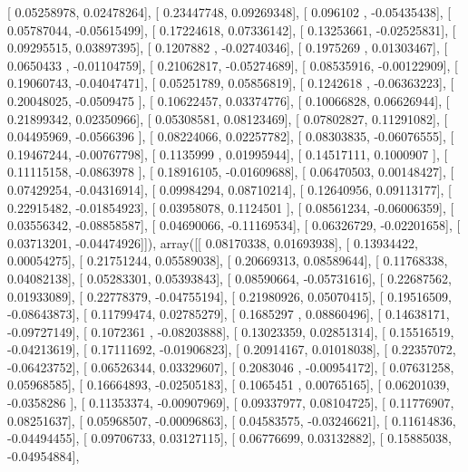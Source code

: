 \documentclass{article}
\begin{document}
       [ 0.05258978,  0.02478264],
       [ 0.23447748,  0.09269348],
       [ 0.096102  , -0.05435438],
       [ 0.05787044, -0.05615499],
       [ 0.17224618,  0.07336142],
       [ 0.13253661, -0.02525831],
       [ 0.09295515,  0.03897395],
       [ 0.1207882 , -0.02740346],
       [ 0.1975269 ,  0.01303467],
       [ 0.0650433 , -0.01104759],
       [ 0.21062817, -0.05274689],
       [ 0.08535916, -0.00122909],
       [ 0.19060743, -0.04047471],
       [ 0.05251789,  0.05856819],
       [ 0.1242618 , -0.06363223],
       [ 0.20048025, -0.0509475 ],
       [ 0.10622457,  0.03374776],
       [ 0.10066828,  0.06626944],
       [ 0.21899342,  0.02350966],
       [ 0.05308581,  0.08123469],
       [ 0.07802827,  0.11291082],
       [ 0.04495969, -0.0566396 ],
       [ 0.08224066,  0.02257782],
       [ 0.08303835, -0.06076555],
       [ 0.19467244, -0.00767798],
       [ 0.1135999 ,  0.01995944],
       [ 0.14517111,  0.1000907 ],
       [ 0.11115158, -0.0863978 ],
       [ 0.18916105, -0.01609688],
       [ 0.06470503,  0.00148427],
       [ 0.07429254, -0.04316914],
       [ 0.09984294,  0.08710214],
       [ 0.12640956,  0.09113177],
       [ 0.22915482, -0.01854923],
       [ 0.03958078,  0.1124501 ],
       [ 0.08561234, -0.06006359],
       [ 0.03556342, -0.08858587],
       [ 0.04690066, -0.11169534],
       [ 0.06326729, -0.02201658],
       [ 0.03713201, -0.04474926]]), array([[ 0.08170338,  0.01693938],
       [ 0.13934422,  0.00054275],
       [ 0.21751244,  0.05589038],
       [ 0.20669313,  0.08589644],
       [ 0.11768338,  0.04082138],
       [ 0.05283301,  0.05393843],
       [ 0.08590664, -0.05731616],
       [ 0.22687562,  0.01933089],
       [ 0.22778379, -0.04755194],
       [ 0.21980926,  0.05070415],
       [ 0.19516509, -0.08643873],
       [ 0.11799474,  0.02785279],
       [ 0.1685297 ,  0.08860496],
       [ 0.14638171, -0.09727149],
       [ 0.1072361 , -0.08203888],
       [ 0.13023359,  0.02851314],
       [ 0.15516519, -0.04213619],
       [ 0.17111692, -0.01906823],
       [ 0.20914167,  0.01018038],
       [ 0.22357072, -0.06423752],
       [ 0.06526344,  0.03329607],
       [ 0.2083046 , -0.00954172],
       [ 0.07631258,  0.05968585],
       [ 0.16664893, -0.02505183],
       [ 0.1065451 ,  0.00765165],
       [ 0.06201039, -0.0358286 ],
       [ 0.11353374, -0.00907969],
       [ 0.09337977,  0.08104725],
       [ 0.11776907,  0.08251637],
       [ 0.05968507, -0.00096863],
       [ 0.04583575, -0.03246621],
       [ 0.11614836, -0.04494455],
       [ 0.09706733,  0.03127115],
       [ 0.06776699,  0.03132882],
       [ 0.15885038, -0.04954884],
\end{document}

